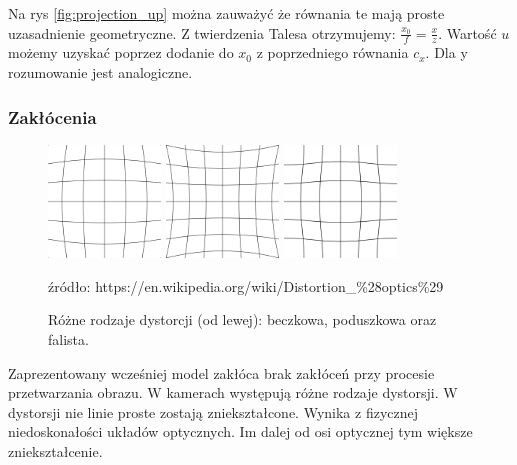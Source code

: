 \documentclass[oneside, eng]{mgr}
\begin{document}
Na rys \ref{fig:projection_up} można zauważyć że równania te mają proste uzasadnienie geometryczne. Z twierdzenia Talesa otrzymujemy: 
$\frac{x_0}{f} = \frac{x}{z}$. Wartość $u$ możemy uzyskać poprzez dodanie do $x_0$ z poprzedniego równania $c_x$. Dla y rozumowanie jest analogiczne.


\subsubsection{Zakłócenia}

\begin{figure}
\centering
		\begin{minipage}{3cm}
			\includegraphics[width=3cm]{600px-Barrel_distortion.png}
		\end{minipage}
		\begin{minipage}{3cm}
			\includegraphics[width=3cm]{600px-Pincushion_distortion.png}
		\end{minipage}
		\begin{minipage}{3cm}
			\includegraphics[width=3cm]{600px-Mustache_distortion.png}
		\end{minipage}
	\caption{Różne rodzaje dystorcji (od lewej): beczkowa, poduszkowa oraz falista.}
źródło: https://en.wikipedia.org/wiki/Distortion\_\%28optics\%29
	\label{fig:distortion}
\end{figure}

Zaprezentowany wcześniej model zakłóca brak zakłóceń przy procesie przetwarzania obrazu. W kamerach występują różne rodzaje dystorsji. W dystorsji nie linie proste zostają zniekształcone. Wynika z fizycznej niedoskonałości układów optycznych. Im dalej od osi optycznej tym większe zniekształcenie.
\end{document}
